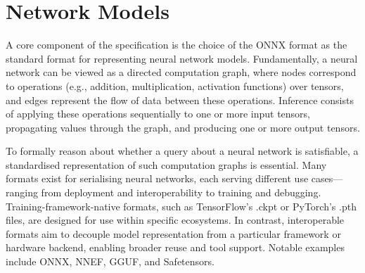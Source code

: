 \chapter{Network Models}
\label{sec:models}
%
A core component of the \vnnlib{} specification is the choice of the ONNX format as the standard format for representing neural network models. Fundamentally, a neural network can be viewed as a directed computation graph, where nodes correspond to operations (e.g., addition, multiplication, activation functions) over tensors, and edges represent the flow of data between these operations. Inference consists of applying these operations sequentially to one or more input tensors, propagating values through the graph, and producing one or more output tensors.

To formally reason about whether a query about a neural network is satisfiable, a standardised representation of such computation graphs is essential. Many formats exist for serialising neural networks, each serving different use cases—ranging from deployment and interoperability to training and debugging. Training-framework-native formats, such as TensorFlow’s .ckpt or PyTorch’s .pth files, are designed for use within specific ecosystems. In contrast, interoperable formats aim to decouple model representation from a particular framework or hardware backend, enabling broader reuse and tool support. Notable examples include ONNX, NNEF, GGUF, and Safetensors.

